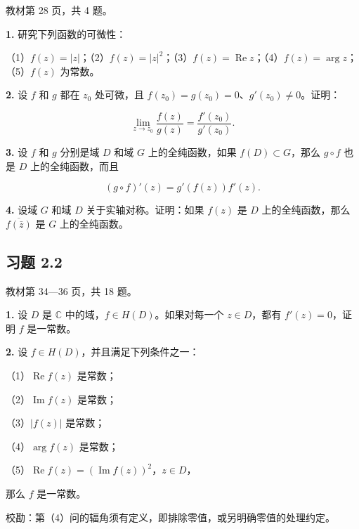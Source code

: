 \documentclass[11pt,a4paper]{article}
\begin{document}
教材第 28 页，共 4 题。

\par{}
\noindent\textbf{1.} 研究下列函数的可微性：

（1）\(f(z)=|z|\)；（2）\(f(z)=|z|^2\)；（3）\(f(z)=\operatorname{Re}z\)；（4）\(f(z)=\arg z\)；（5）\(f(z)\)
为常数。

\par{}
\noindent\textbf{2.} 设 \(f\) 和 \(g\) 都在 \(z_0\) 处可微，且
\(f(z_0)=g(z_0)=0\)、\(g'(z_0)\ne0\)。证明：

\[
\lim_{z\to z_0}\frac{f(z)}{g(z)}=\frac{f'(z_0)}{g'(z_0)}.
\]

\par{}
\noindent\textbf{3.} 设 \(f\) 和 \(g\) 分别是域 \(D\) 和域 \(G\)
上的全纯函数，如果 \(f(D)\subset G\)，那么 \(g\circ f\) 也是 \(D\)
上的全纯函数，而且

\[
(g\circ f)'(z)=g'(f(z))f'(z).
\]

\par{}
\noindent\textbf{4.} 设域 \(G\) 和域 \(D\) 关于实轴对称。证明：如果 \(f(z)\) 是
\(D\) 上的全纯函数，那么 \(\overline{f(\bar z)}\) 是 \(G\)
上的全纯函数。

\subsection{习题 2.2}\label{ch02-practice-ux4e60ux9898-2.2}

教材第 34---36 页，共 18 题。

\par{}
\noindent\textbf{1.} 设 \(D\) 是 \(\mathbb C\)
中的域，\(f\in H(D)\)。如果对每一个 \(z\in D\)，都有 \(f'(z)=0\)，证明
\(f\) 是一常数。

\par{}
\noindent\textbf{2.} 设 \(f\in H(D)\)，并且满足下列条件之一：

（1）\(\operatorname{Re}f(z)\) 是常数；

（2）\(\operatorname{Im}f(z)\) 是常数；

（3）\(|f(z)|\) 是常数；

（4）\(\arg f(z)\) 是常数；

（5）\(\operatorname{Re}f(z)=(\operatorname{Im}f(z))^2\)，\(z\in D\)，

那么 \(f\) 是一常数。

校勘：第（4）问的辐角须有定义，即排除零值，或另明确零值的处理约定。
\end{document}
